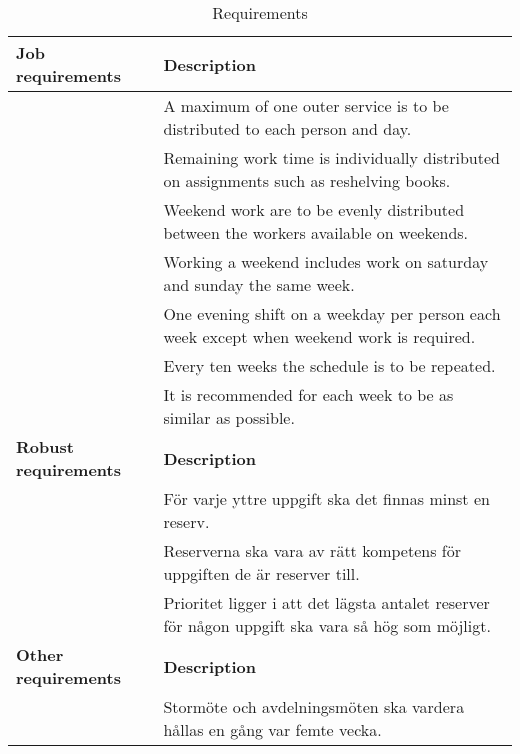 \begin{table}[H]
\caption{Requirements}
\label{int:3}
\begin{tabular}{|l|l|}
\hline
\textbf{Job requirements} & \textbf{Description} \\ \hline
& A maximum of one outer service is to be distributed to each person and day.
\\ \hline 
& Remaining work time is individually distributed on assignments such as reshelving books.
\\ \hline
 & Weekend work are to be evenly distributed between the workers available on weekends. 
\\ \hline 
 & Working a weekend includes work on saturday and sunday the same week.
\\ \hline 
 & One evening shift on a weekday per person each week except when weekend work is required.
\\ \hline 
 & Every ten weeks the schedule is to be repeated.
\\ \hline 
 & It is recommended for each week to be as similar as possible.
\\ \hline 

\textbf{Robust requirements} & \textbf{Description} \\ \hline
 & För varje yttre uppgift ska det finnas minst en reserv.
\\ \hline 
 & Reserverna ska vara av rätt kompetens för uppgiften de är reserver till.
\\ \hline 
 & Prioritet ligger i att det lägsta antalet reserver för någon uppgift ska vara så hög som möjligt.
\\ \hline 

\textbf{Other requirements} & \textbf{Description} \\ \hline
 & Stormöte och avdelningsmöten ska vardera hållas en gång var femte vecka.
\\ \hline 
\end{tabular}
\end{table}
\medskip



